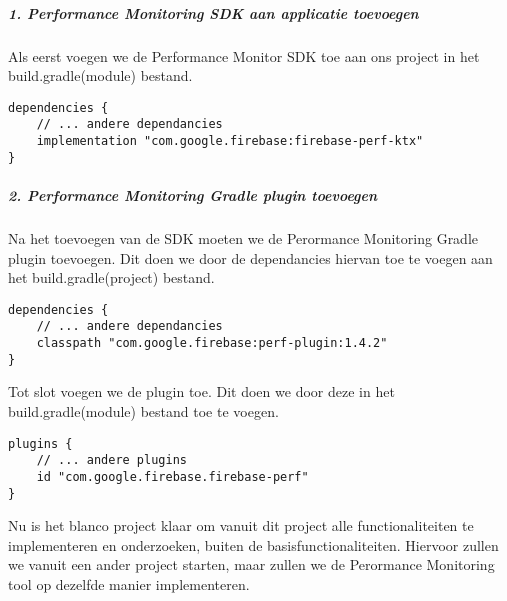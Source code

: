 \subparagraph{1. Performance Monitoring SDK aan applicatie toevoegen}
Als eerst voegen we de Performance Monitor SDK toe aan ons project in het build.gradle(module) bestand.
\begin{verbatim}
dependencies {
    // ... andere dependancies
    implementation "com.google.firebase:firebase-perf-ktx"
}
\end{verbatim}

\subparagraph{2. Performance Monitoring Gradle plugin toevoegen}
Na het toevoegen van de SDK moeten we de Perormance Monitoring Gradle plugin toevoegen. 
Dit doen we door de dependancies hiervan toe te voegen aan het build.gradle(project) bestand.
\begin{verbatim}
dependencies {
    // ... andere dependancies
    classpath "com.google.firebase:perf-plugin:1.4.2"
}
\end{verbatim}
Tot slot voegen we de plugin toe. Dit doen we door deze in het build.gradle(module) bestand toe te voegen.
\begin{verbatim}
plugins {
    // ... andere plugins
    id "com.google.firebase.firebase-perf"
}
\end{verbatim}
Nu is het blanco project klaar om vanuit dit project alle functionaliteiten te 
implementeren en onderzoeken, buiten de basisfunctionaliteiten. Hiervoor zullen we vanuit een ander project starten, 
maar zullen we de Perormance Monitoring tool op dezelfde manier implementeren.